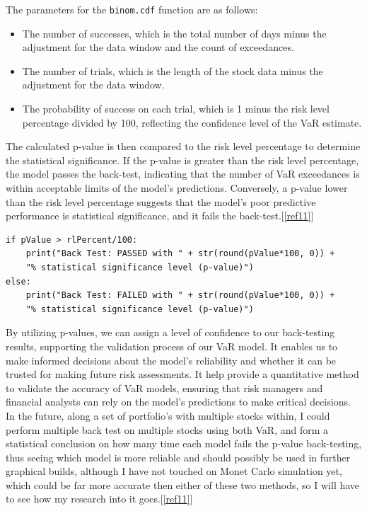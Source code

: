 \documentclass{article}
\begin{document}
 The parameters for the \texttt{binom.cdf} function are as follows:

\begin{itemize}
    \item The number of successes, which is the total number of days minus the adjustment for the data window and the count of exceedances.
    \item The number of trials, which is the length of the stock data minus the adjustment for the data window.
    \item The probability of success on each trial, which is 1 minus the risk level percentage divided by 100, reflecting the confidence level of the VaR estimate.
\end{itemize}

The calculated p-value is then compared to the risk level percentage to determine the statistical significance. If the p-value is greater than the risk level percentage, the model passes the back-test, indicating that the number of VaR exceedances is within acceptable limits of the model's predictions. Conversely, a p-value lower than the risk level percentage suggests that the model's poor predictive performance is statistical significance, and it fails the back-test.[\ref{ref11}]

\begin{verbatim}
if pValue > rlPercent/100:
    print("Back Test: PASSED with " + str(round(pValue*100, 0)) + 
    "% statistical significance level (p-value)")
else:
    print("Back Test: FAILED with " + str(round(pValue*100, 0)) + 
    "% statistical significance level (p-value)")
\end{verbatim}

By utilizing p-values, we can assign a level of confidence to our back-testing results, supporting the validation process of our VaR model. It enables us to make informed decisions about the model's reliability and whether it can be trusted for making future risk assessments. It help provide a quantitative method to validate the accuracy of VaR models, ensuring that risk managers and financial analysts can rely on the model's predictions to make critical decisions. In the future, along a set of portfolio's with multiple stocks within, I could perform multiple back test on multiple stocks using both VaR, and form a statistical conclusion on how many time each model fails the p-value back-testing, thus seeing which model is more reliable and should possibly be used in further graphical builds, although I have not touched on Monet Carlo simulation yet, which could be far more accurate then either of these two methods, so I will have to see how my research into it goes.[\ref{ref11}]
\end{document}
